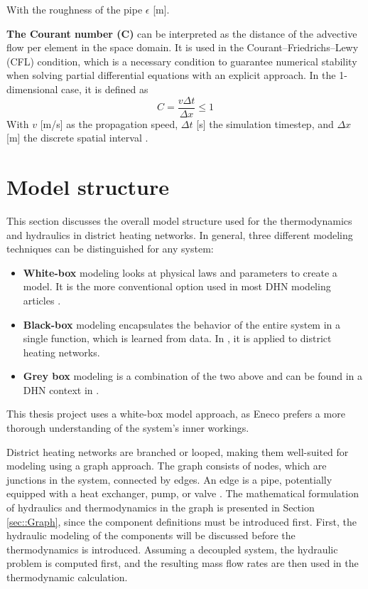 
With the roughness of the pipe $\epsilon$ [m].

\textbf{The Courant number (C)} can be interpreted as the distance of the advective flow per element in the space domain. It is used in the Courant–Friedrichs–Lewy (CFL) condition, which is a necessary condition to guarantee numerical stability when solving partial differential equations with an explicit approach. In the 1-dimensional case, it is defined as
\begin{equation}
    C = \frac{v \Delta t}{\Delta x} \leq 1
\end{equation}
With $v$ [m/s] as the propagation speed, $\Delta t$ [s] the simulation timestep, and $\Delta x$ [m] the discrete spatial interval \cite{MaxCourant}. 

\section{Model structure}
This section discusses the overall model structure used for the thermodynamics and hydraulics in district heating networks. In general, three different modeling techniques can be distinguished for any system:

\begin{itemize}
    \item \textbf{White-box} modeling looks at physical laws and parameters to create a model. It is the more conventional option used in most DHN modeling articles \cite{sibeijn2025economic,PipePDE}.
    \item \textbf{Black-box} modeling encapsulates the behavior of the entire system in a single function, which is learned from data. In \cite{GUELPA2016586}\cite{KECEBAS2012339}, it is applied to district heating networks.
    \item \textbf{Grey box} modeling is a combination of the two above and can be found in a DHN context in \cite{grey1}\cite{grey2}. 
\end{itemize}
This thesis project uses a white-box model approach, as Eneco prefers a more thorough understanding of the system's inner workings. 

District heating networks are branched or looped, making them well-suited for modeling using a graph approach. The graph consists of nodes, which are junctions in the system, connected by edges. An edge is a pipe, potentially equipped with a heat exchanger, pump, or valve \cite{sibeijn2025economic}. The mathematical formulation of hydraulics and thermodynamics in the graph is presented in Section \ref{sec::Graph}, since the component definitions must be introduced first. First, the hydraulic modeling of the components will be discussed before the thermodynamics is introduced. Assuming a decoupled system, the hydraulic problem is computed first, and the resulting mass flow rates are then used in the thermodynamic calculation. 

